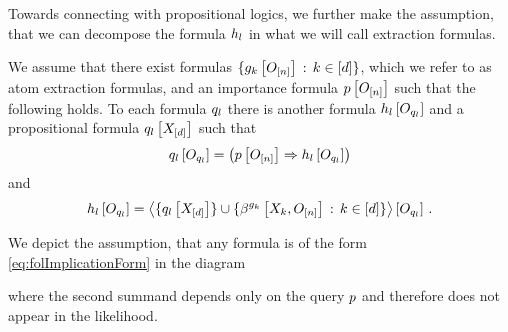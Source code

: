 Towards connecting with propositional logics, we further make the assumption, that we can decompose the formula $h_{l}$ in what we will call extraction formulas.

\begin{assumption}
    \label{ass:propositionalHeads}
    We assume that there exist formulas $\{g_{k}\left[O_{[n]}\right] \, : \, k\in[d]\}$, which we refer to as atom extraction formulas, and an importance formula $p\left[O_{[n]}\right]$ such that the following holds.
    To each \firstOrderLogic{} formula $q_{l}$ there is another \firstOrderLogic{} formula $h_{l}\left[O_{q_{l}}\right]$ and a propositional formula $q_{l}\left[X_{[d]}\right]$ such that
    \begin{align*}
        q_{l}\left[O_{q_{l}}\right]
        = \left( p\left[O_{[n]}\right] \Rightarrow h_{l}\left[O_{q_{l}}\right] \right)
    \end{align*}
    and
    \begin{align*}
        h_{l}\left[O_{q_{l}}\right] =
        \left\langle 
            \{q_{l}\left[X_{[d]}\right]\} \cup \{\beta^{g_{k}}\left[X_{k},O_{[n]}\right] \, : \, k\in[d]\}
        \right\rangle \left[ O_{q_{l}} \right] \, .
    \end{align*}
\end{assumption}

We depict the assumption, that any formula is of the form \eqref{eq:folImplicationForm} in the diagram
\begin{center}
    
\end{center}
where the second summand depends only on the query $p$ and therefore does not appear in the likelihood.




